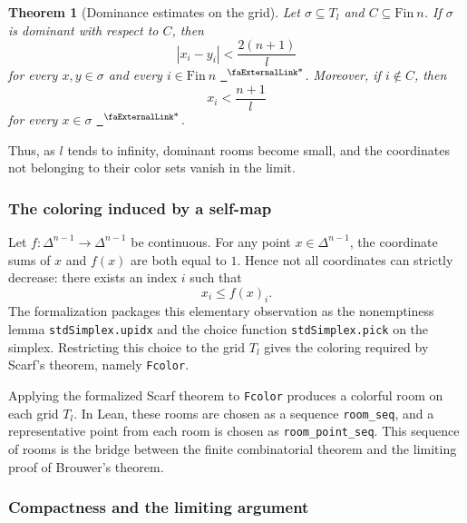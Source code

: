 \documentclass{article}
\newtheorem{theorem}{Theorem}[section]
\theoremstyle{definition}
\newcommand{\extlink}{~\ensuremath{{}^\text{\faExternalLink*}}}
\begin{document}
\begin{theorem}[Dominance estimates on the grid]
Let $\sigma \subseteq T_l$ and $C \subseteq \mathrm{Fin}\ n$. If $\sigma$ is dominant with respect to $C$, then
$$
|x_i-y_i| < \frac{2(n+1)}{l}
$$
for every $x,y\in \sigma$ and every $i \in \mathrm{Fin}\ n$
\href{https://github.com/Solo-ary/Game-Theory-Formalization/blob/7b49d5267d4f26b17bdf071250880b63e96999b6/Brouwer/Gametheory/Brouwer.lean#L203-L315}{\extlink}.
Moreover, if $i\notin C$, then
$$
x_i < \frac{n+1}{l}
$$
for every $x\in\sigma$
\href{https://github.com/Solo-ary/Game-Theory-Formalization/blob/7b49d5267d4f26b17bdf071250880b63e96999b6/Brouwer/Gametheory/Brouwer.lean#L317-L362}{\extlink}.
\end{theorem}

Thus, as $l$ tends to infinity, dominant rooms become small, and the coordinates not belonging to their color sets vanish in the limit.

\subsubsection{The coloring induced by a self-map}

Let $f:\Delta^{n-1}\to\Delta^{n-1}$ be continuous. For any point $x\in\Delta^{n-1}$, the coordinate sums of $x$ and $f(x)$ are both equal to $1$. Hence not all coordinates can strictly decrease: there exists an index $i$ such that
$$
x_i \leq f(x)_i.
$$
The formalization packages this elementary observation as the nonemptiness lemma \verb|stdSimplex.upidx| and the choice function \verb|stdSimplex.pick| on the simplex. Restricting this choice to the grid $T_l$ gives the coloring required by Scarf's theorem, namely \verb|Fcolor|.


Applying the formalized Scarf theorem to \verb|Fcolor| produces a colorful room on each grid $T_l$. In Lean, these rooms are chosen as a sequence \verb|room_seq|, and a representative point from each room is chosen as \verb|room_point_seq|. This sequence of rooms is the bridge between the finite combinatorial theorem and the limiting proof of Brouwer's theorem.


\subsubsection{Compactness and the limiting argument}
\end{document}
